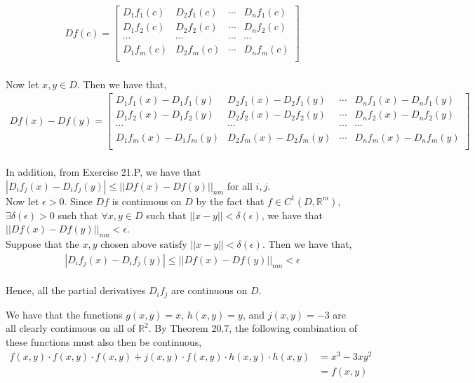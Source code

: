 \documentclass[12pt]{article}
\newenvironment{problem}[2][Problem]{\begin{trivlist}
\item[\hskip \labelsep {\bfseries #1}\hskip \labelsep {\bfseries #2.}]}{\end{trivlist}}
\begin{document}
\begin{align*}
Df(c) = \begin{bmatrix} 
D_1f_1(c) & D_2f_1(c) & \cdots & D_nf_1(c) \\
D_1f_2(c) & D_2f_2(c) & \cdots & D_nf_2(c)\\
\cdots  & \cdots  & \cdots & \cdots \\
D_1f_m(c) & D_2f_m(c) & \cdots & D_nf_m(c) \\
\end{bmatrix}
\end{align*}
\\
Now let $x, y \in D$. Then we have that,
\begin{align*}
Df(x) - Df(y) = \begin{bmatrix} 
D_1f_1(x) - D_1f_1(y) & D_2f_1(x) - D_2f_1(y) & \cdots & D_nf_1(x) - D_nf_1(y) \\
D_1f_2(x) - D_1f_2(y) & D_2f_2(x) - D_2f_2(y) & \cdots & D_nf_2(x) - D_nf_2(y)\\
\cdots  & \cdots  & \cdots & \cdots \\
D_1f_m(x) - D_1f_m(y) & D_2f_m(x) - D_2f_m(y) & \cdots & D_nf_m(x) - D_nf_m(y) \\
\end{bmatrix}
\end{align*}
\\
In addition, from Exercise 21.P, we have that $|D_if_j(x) - D_if_j(y)| \leq ||Df(x) - Df(y)||_{nm}$ for all $i, j$.\\

Now let $\epsilon > 0$. Since $Df$ is continuous on $D$ by the fact that $f \in C^1(D, \mathbb{R}^m)$, $\exists \delta(\epsilon) > 0$ such that $\forall x, y \in D$ such that $||x - y|| < \delta(\epsilon)$, we have that $||Df(x) - Df(y)||_{nm} < \epsilon$.\\

Suppose that the $x, y$ chosen above satisfy $||x - y|| < \delta(\epsilon)$. Then we have that,
\begin{align*}
|D_if_j(x) - D_if_j(y)| \leq ||Df(x) - Df(y)||_{nm} < \epsilon
\end{align*}
\\
Hence, all the partial derivatives $D_if_j$ are continuous on $D$.

\begin{problem}{4}
\end{problem}

We have that the functions $g(x,y) = x$, $h(x, y) = y$, and $j(x, y) = -3$ are all clearly continuous on all of $\mathbb{R}^2$. By Theorem 20.7, the following combination of these functions must also then be continuous,
\begin{align*}
f(x, y) \cdot f(x,y) \cdot f(x,y) + j(x,y) \cdot f(x,y) \cdot h(x,y) \cdot h(x,y) &= x^3 - 3xy^2\\
&= f(x, y)
\end{align*}
\end{document}
